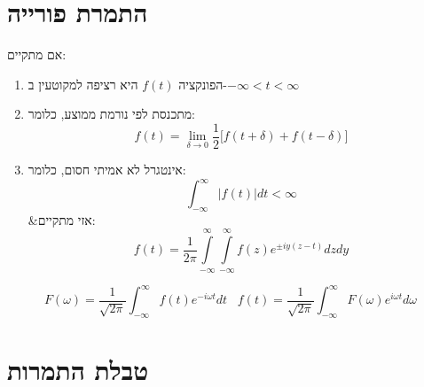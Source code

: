 \documentclass{tstextbook}
\begin{document}
\section{התמרת פורייה}

\begin{theorem}
אם מתקיים:

  \begin{enumerate}
    \item הפונקציה \(f(t)\) היא רציפה למקוטעין ב-\(-\infty<t<\infty\)


    \item מתכנסת לפי נורמת ממוצע, כלומר: 
$$f(t)=\operatorname*{lim}_{\delta\to0}\frac{1}{2}\bigl[f(t+\delta)+f(t-\delta)\bigr]$$


    \item אינטגרל לא אמיתי חסום, כלומר: 
$$\int_{-\infty}^{\infty}\left|f(t)\right|d t<\infty$$
&אזי מתקיים:
$$f(t)=\frac{1}{2\pi}\int\limits_{-\infty}^{\infty}\int\limits_{-\infty}^{\infty}f(z)e^{\pm i y(z-t)}d z d y$$


  \end{enumerate}
\end{theorem}
\begin{proposition}
$$F\left( \omega \right)\!=\!\frac{1}{\sqrt{2\pi}}\int_{-\infty}^\infty f(t)e^{-i\omega t}dt\;\;\; f(t)\!=\!\frac{1}{\sqrt{2\pi}}\int_{-\infty}^\infty F\left( \omega \right)e^{i\omega t}d\omega$$

\end{proposition}
\section{טבלת התמרות}
\end{document}
